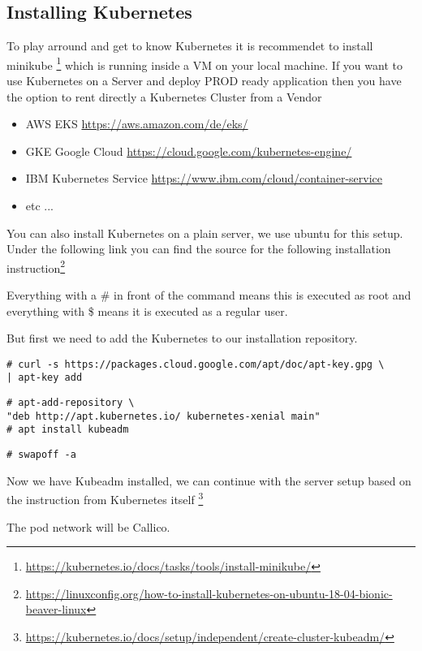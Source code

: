 \subsection{Installing Kubernetes}


To play arround and get to know Kubernetes it is recommendet to install minikube \footnote{\url{https://kubernetes.io/docs/tasks/tools/install-minikube/}} which is running inside a VM on your local machine.
If you want to use Kubernetes on a Server and deploy PROD ready application then you have the option to rent directly a Kubernetes Cluster from a Vendor
\begin{itemize}
\item AWS EKS \url{https://aws.amazon.com/de/eks/}
\item GKE Google Cloud \url{https://cloud.google.com/kubernetes-engine/}
\item IBM Kubernetes Service \url{https://www.ibm.com/cloud/container-service}
\item etc ...
\end{itemize}

You can also install Kubernetes on a plain server, we use ubuntu for this setup. Under the following link you can find the source for the following installation instruction\footnote{\url{https://linuxconfig.org/how-to-install-kubernetes-on-ubuntu-18-04-bionic-beaver-linux}}

Everything with a \# in front of the command means this is executed as root and everything with \$ means it is executed as a regular user.

 But first we need to add the Kubernetes to our installation repository.
\begin{verbatim}
# curl -s https://packages.cloud.google.com/apt/doc/apt-key.gpg \ 
| apt-key add
\end{verbatim}

\begin{verbatim}
# apt-add-repository \
"deb http://apt.kubernetes.io/ kubernetes-xenial main"
# apt install kubeadm 
\end{verbatim}

\begin{verbatim}
# swapoff -a
\end{verbatim}

Now we have Kubeadm installed, we can continue with the server setup based on the instruction from Kubernetes itself \footnote{\url{https://kubernetes.io/docs/setup/independent/create-cluster-kubeadm/}}

The pod network will be Callico.

